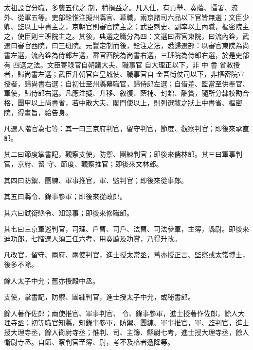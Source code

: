
\begin{pinyinscope}

 太祖設官分職，多襲五代之
 制，稍損益之。凡入仕，有貢舉、奏蔭、攝署、流外、從軍五等。吏部銓惟注擬州縣官、幕職，兩京諸司六品以下官皆無選；文臣少卿、監以上中書主之，京朝官則審官院主之；武臣剌史、副率以上內職，樞密院主之，使臣則三班院主之。其後，典選之職分為四：文選曰審官東院，曰流內銓，武選曰審官西院，曰三班院。元豐定制而後，銓注之法，悉歸選部：以審官東院為尚書左選，流內銓為侍郎左選，審官西院為尚書右選，三班院為侍郎右選，於是吏部有
 四選之法。文臣寄祿官自朝議大夫、職事官
 自大理正以下，非
 中
 書
 省敕授者，歸尚書左選；武臣升朝官自皇城使、職事官自
 金吾街仗司以下，非樞密院宣授者，歸尚書右選；自初仕至州縣幕職官，歸侍郎左選；自借差、監當至供奉官、軍使，歸侍郎右選。凡應注擬、升移、敘復、蔭補、封贈、酬賞，隨所分隸校勘合格，團甲以上尚書省，若中散大夫、閣門使以上，則列選敘之狀上中書省、樞密院，得畫旨，給告身。



 凡選人階官為七等：其一曰三京府判官，留守判官，節度、觀察判官；即後來承直郎。



 其二曰節度掌書記，觀察支使，防禦、團練判官；即後來儒林郎。其三曰軍事判官，京府、留
 守、節度、觀察推官；即後來文林郎。



 其四曰防禦、團練、軍事推官，軍、監判官；即後來從事郎。



 其五曰縣令、錄事參軍；即後來從政郎。



 其六曰試銜縣令、知錄事；即後來修職郎。



 其七曰三京軍巡判官，司理、戶曹、司戶、法曹、司法參軍，主簿，縣尉。即後來迪功郎。七階選人須三任六考，用奏薦及功賞，乃得升改。



 凡改官，留守、兩府、兩使判官，進士授太常丞，舊亦授正言、監察或太常博士，後多不除。



 餘人太子中允；舊亦授殿中丞。



 支使，掌書記，防禦、團練判官，進士授太子中允，或秘書郎。



 餘人著作佐郎；兩使推官、軍事判官、
 令、錄事參軍，進士授著作佐郎，餘人大理寺丞；初等職官知縣，知錄事參軍，防禦、團練、軍事推官，軍、監判官，進士授大理寺丞，餘人衛尉寺丞；惟判、司、主簿、縣尉七考，進士授大理寺丞，餘人衛尉寺丞。自節、察判官至簿、尉，考不及格者遞降等。




\end{pinyinscope}
